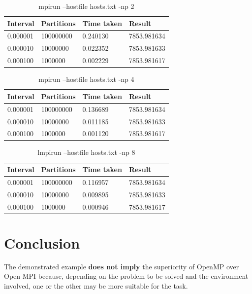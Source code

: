 \begin{table}[h]
	\caption{mpirun --hostfile hosts.txt -np 2}
	\begin{center}
		\begin{tabular}{|l|l|l|l|}
			\hline
			Interval & Partitions & Time taken & Result \\
			\hline
			0.000001 & 100000000 & 0.240130 & 7853.981634 \\
			0.000010 & 10000000 & 0.022352 & 7853.981633 \\
			0.000100 & 1000000 & 0.002229 & 7853.981617 \\
			\hline
		\end{tabular}
	\end{center}
\end{table}

\begin{table}[h]
	\caption{mpirun --hostfile hosts.txt -np 4}
	\begin{center}
		\begin{tabular}{|l|l|l|l|}
			\hline
			Interval & Partitions & Time taken & Result \\
			\hline
			0.000001 & 100000000 & 0.136689 & 7853.981634 \\
			0.000010 & 10000000 & 0.011185 & 7853.981633 \\
			0.000100 & 1000000 & 0.001120 & 7853.981617 \\
			\hline
		\end{tabular}
	\end{center}
\end{table}

\begin{table}[h]
	\caption{lmpirun --hostfile hosts.txt -np 8}
	\begin{center}
		\begin{tabular}{|l|l|l|l|}
			\hline
			Interval & Partitions & Time taken & Result \\
			\hline
			0.000001 & 100000000 & 0.116957 & 7853.981634 \\
			0.000010 & 10000000 & 0.009895 & 7853.981633 \\
			0.000100 & 1000000 & 0.000946 & 7853.981617 \\
			\hline
	\end{tabular}
	\end{center}
\end{table}
	
	\section{Conclusion}
		\par The demonstrated example \textbf{does not imply} the superiority of OpenMP over Open MPI because, depending on the problem to be solved and the environment involved, one or the other may be more suitable for the task.
		

